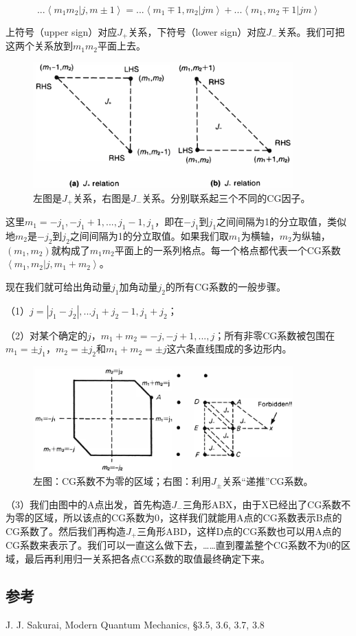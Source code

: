\begin{equation}
... \left\langle m_1 m_2 | j, m \pm 1 \right\rangle = ... \left\langle m_1 \mp 1, m_2 | j m \right\rangle + ... \left\langle m_1,  m_2 \mp 1  | j m \right\rangle
\end{equation}

上符号（upper sign）对应$J_+$关系，下符号（lower sign）对应$J_-$关系。我们可把这两个关系放到$m_1  m_2$平面上去。

\begin{figure}[htbp]
\begin{center}
\includegraphics[width=10cm]{AngularMomentum/J+J-relation}
\caption{左图是$J_+$关系，右图是$J_-$关系。分别联系起三个不同的CG因子。}
\end{center}
\end{figure}

这里$m_1 = -j_1, -j_1 + 1, ..., j_1 -1, j_1$，即在$-j_1$到$j_1$之间间隔为1的分立取值，类似地$m_2$是$-j_2$到$j_2$之间间隔为1的分立取值。如果我们取$m_1$为横轴，$m_2$为纵轴，$(m_1, m_2)$就构成了$m_1  m_2$平面上的一系列格点。每一个格点都代表一个CG系数$\left\langle m_1 ,  m_2 | j, m_1 + m_2 \right\rangle$。

现在我们就可给出角动量$j_1$加角动量$j_2$的所有CG系数的一般步骤。

（1）$j = |j_1 - j_2|, ... j_1 + j_2 -1, j_1 + j_2$；

（2）对某个确定的$j$，$m_1 + m_2  = - j, -j +1, ..., j$；所有非零CG系数被包围在$m_1 = \pm j_1$，$m_2 = \pm j_2$和$m_1 + m_2 = \pm j$这六条直线围成的多边形内。

\begin{figure}[htbp]
\begin{center}
\includegraphics[width=10cm]{AngularMomentum/cgcoeficients.png}
\caption{左图：CG系数不为零的区域；右图：利用$J_{\pm}$关系“递推”CG系数。}
\label{default}
\end{center}
\end{figure}

（3）我们由图中的A点出发，首先构造$J_-$三角形ABX，由于X已经出了CG系数不为零的区域，所以该点的CG系数为0，这样我们就能用A点的CG系数表示B点的CG系数了。然后我们再构造$J_+$三角形ABD，这样D点的CG系数也可以用A点的CG系数来表示了。我们可以一直这么做下去，……直到覆盖整个CG系数不为0的区域，最后再利用归一关系把各点CG系数的取值最终确定下来。


\subsection*{参考}

J. J. Sakurai, Modern Quantum Mechanics, \S 3.5, 3.6, 3.7, 3.8
